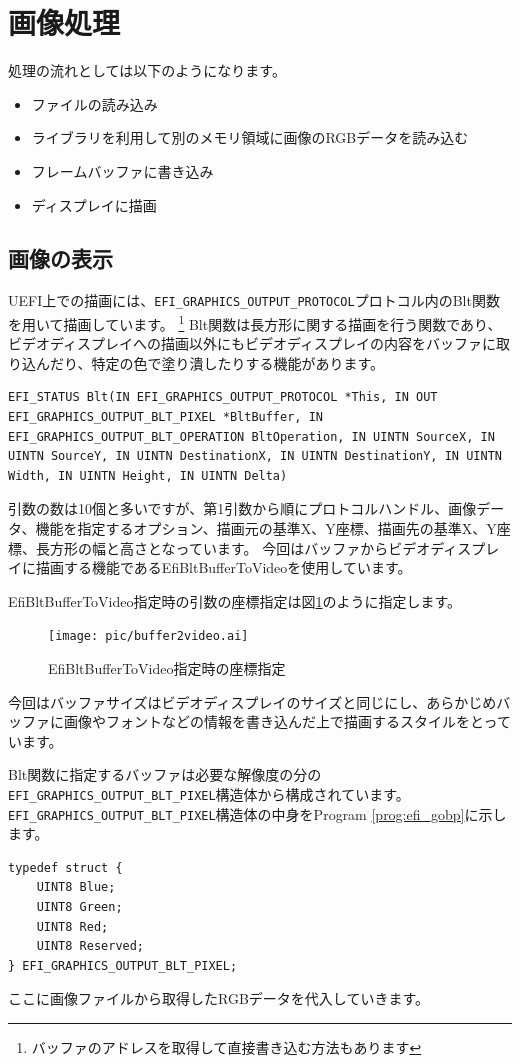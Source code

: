 \documentclass[10pt,b5paper,twoside,openany]{ltjsbook}
\begin{document}
\section{画像処理}
処理の流れとしては以下のようになります。
\begin{itemize}
    \item ファイルの読み込み
    \item ライブラリを利用して別のメモリ領域に画像のRGBデータを読み込む
    \item フレームバッファに書き込み
    \item ディスプレイに描画
\end{itemize}

\subsection{画像の表示}
UEFI上での描画には、\verb+EFI_GRAPHICS_OUTPUT_PROTOCOL+プロトコル内のBlt関数を用いて描画しています。
\footnote{バッファのアドレスを取得して直接書き込む方法もあります}
Blt関数は長方形に関する描画を行う関数であり、ビデオディスプレイへの描画以外にもビデオディスプレイの内容をバッファに取り込んだり、特定の色で塗り潰したりする機能があります。
\begin{lstlisting}[style=customC]
EFI_STATUS Blt(IN EFI_GRAPHICS_OUTPUT_PROTOCOL *This, IN OUT EFI_GRAPHICS_OUTPUT_BLT_PIXEL *BltBuffer, IN EFI_GRAPHICS_OUTPUT_BLT_OPERATION BltOperation, IN UINTN SourceX, IN UINTN SourceY, IN UINTN DestinationX, IN UINTN DestinationY, IN UINTN Width, IN UINTN Height, IN UINTN Delta)
\end{lstlisting}
引数の数は10個と多いですが、第1引数から順にプロトコルハンドル、画像データ、機能を指定するオプション、描画元の基準X、Y座標、描画先の基準X、Y座標、長方形の幅と高さとなっています。
今回はバッファからビデオディスプレイに描画する機能であるEfiBltBufferToVideoを使用しています。

EfiBltBufferToVideo指定時の引数の座標指定は図\ref{fig:buffer2video}のように指定します。
\begin{figure}[H]
    \centering
    \texttt{[image: pic/buffer2video.ai]}
    \caption{EfiBltBufferToVideo指定時の座標指定}
    \label{fig:buffer2video}
\end{figure}
今回はバッファサイズはビデオディスプレイのサイズと同じにし、あらかじめバッファに画像やフォントなどの情報を書き込んだ上で描画するスタイルをとっています。

Blt関数に指定するバッファは必要な解像度の分の\verb+EFI_GRAPHICS_OUTPUT_BLT_PIXEL+構造体から構成されています。
\verb+EFI_GRAPHICS_OUTPUT_BLT_PIXEL+構造体の中身をProgram \ref{prog:efi_gobp}に示します。
\begin{lstlisting}[style=customC,caption=EFI\_GRAPHICS\_OUTPUT\_BLT\_PIXEL,label=prog:efi_gobp]
typedef struct {
    UINT8 Blue;
    UINT8 Green;
    UINT8 Red;
    UINT8 Reserved;
} EFI_GRAPHICS_OUTPUT_BLT_PIXEL;
\end{lstlisting}
ここに画像ファイルから取得したRGBデータを代入していきます。
\end{document}
